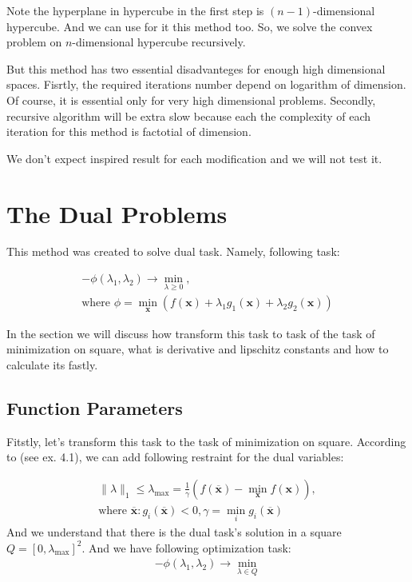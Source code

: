 \documentclass[12pt]{article}
\begin{document}
Note the hyperplane in hypercube in the first step is $(n-1)$-dimensional hypercube. And we can use for it this method too. So, we solve the convex problem on $n$-dimensional hypercube recursively.

But this method has two essential disadvanteges for enough high dimensional spaces. Fisrtly, the required iterations number depend on logarithm of dimension. Of course, it is essential only for very high dimensional problems. Secondly, recursive algorithm will be extra slow because each the complexity of each iteration for this method is factotial of dimension.

We don't expect inspired result for each modification and we will not test it.

\section{The Dual Problems}
\label{details}

This method was created to solve dual task. Namely, following task:

\begin{gather}
-\phi(\lambda_1, \lambda_2) \rightarrow \min_{\lambda\geq 0},\\
\text{where } \phi = \min_\textbf{x}\left(f(\textbf{x}) + \lambda_1 g_1(\textbf{x}) + \lambda_2 g_2(\textbf{x})\right)
\end{gather}

In the section we will discuss how transform this task to task of the task of minimization on square, what is derivative and lipschitz constants and how to calculate its fastly.

\subsection{Function Parameters}

Fitstly, let's transform this task to the task of minimization on square. According to \cite{task} (see ex. 4.1), we can add following restraint for the dual variables:

\begin{gather}
\label{restr:dual}
\|{\lambda}\|_1 \leq \lambda_{\text{max}} = \frac{1}{\gamma}\left(f(\overline{\textbf{x}}) -\min\limits_{\textbf{x}}f(\textbf{x})\right),\\
\text{where $\overline{\textbf{x}}:g_i(\overline{\textbf{x}})<0,\gamma = \min\limits_ig_i(\overline{\textbf{x}})$}
\end{gather}
And we understand that there is the dual task's solution in a square $Q = [0, \lambda_{\text{max}}]^2$. And we have following optimization task:
\begin{gather}
\label{dual}
-\phi(\lambda_1, \lambda_2) \rightarrow \min_{\lambda \in Q}
\end{gather}
\end{document}
